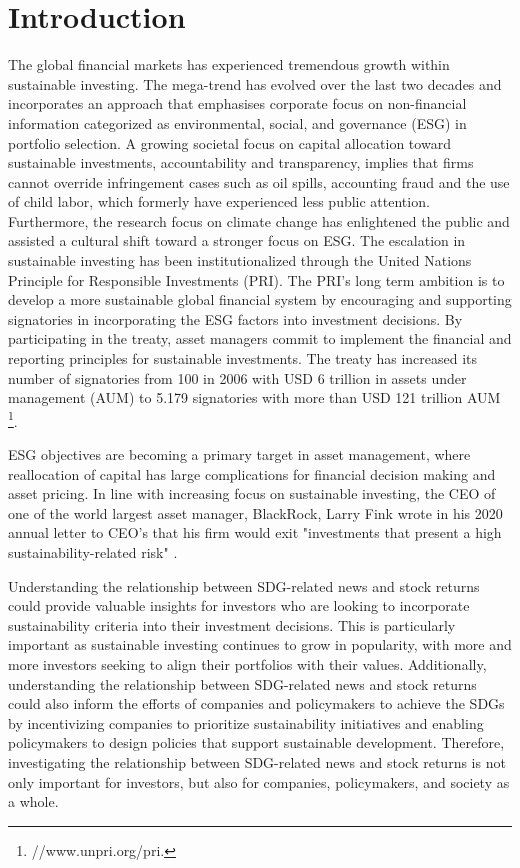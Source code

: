 \section{Introduction} \label{sec:intro}
The global financial markets has experienced tremendous growth within sustainable investing. The mega-trend has evolved over the last two decades and incorporates an approach that emphasises corporate focus on non-financial information categorized as environmental, social, and governance (ESG) in portfolio selection. A growing societal focus on capital allocation toward sustainable investments, accountability and transparency, implies that firms cannot override infringement cases such as oil spills, accounting fraud and the use of child labor, which formerly have experienced less public attention. Furthermore, the research focus on climate change has enlightened the public and assisted a cultural shift toward a stronger focus on ESG. The escalation in sustainable investing has been institutionalized through the United Nations Principle for Responsible Investments (PRI). The PRI's long term ambition is to develop a more sustainable global financial system by encouraging and supporting signatories in incorporating the ESG factors into investment decisions. By participating in the treaty, asset managers commit to implement the financial and reporting principles for sustainable investments. The treaty has increased its number of signatories from 100 in 2006 with USD 6 trillion in assets under management (AUM) to 5.179 signatories with more than USD 121 trillion AUM \footnote{//www.unpri.org/pri.}. 

ESG objectives are becoming a primary target in asset management, where reallocation of capital has large complications for financial decision making and asset pricing. In line with increasing focus on sustainable investing, the CEO of one of the world largest asset manager, BlackRock, Larry Fink wrote in his 2020 annual letter to CEO's that his firm would exit "investments that present a high sustainability-related risk" \citep{Blackrock}. 

Understanding the relationship between SDG-related news and stock returns could provide valuable insights for investors who are looking to incorporate sustainability criteria into their investment decisions. This is particularly important as sustainable investing continues to grow in popularity, with more and more investors seeking to align their portfolios with their values. Additionally, understanding the relationship between SDG-related news and stock returns could also inform the efforts of companies and policymakers to achieve the SDGs by incentivizing companies to prioritize sustainability initiatives and enabling policymakers to design policies that support sustainable development. Therefore, investigating the relationship between SDG-related news and stock returns is not only important for investors, but also for companies, policymakers, and society as a whole.


